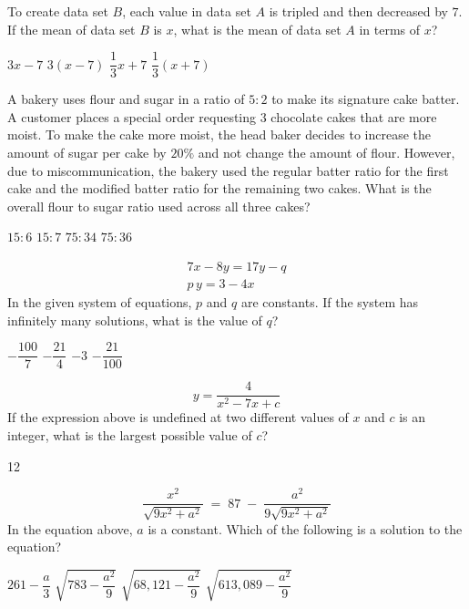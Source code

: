 \question[1]
To create data set $B$, each value in data set $A$ is tripled and then decreased by $7$. If the mean of data set $B$ is $x$, what is the mean of data set $A$ in terms of $x$?
\begin{choices}
  \choice $3x-7$
  \choice $3(x-7)$
  \choice $\dfrac{1}{3}x+7$
  \CorrectChoice $\dfrac{1}{3}(x+7)$
\end{choices}






\newpage




\question[1]
A bakery uses flour and sugar in a ratio of $5:2$ to make its signature cake batter. A customer places a special order requesting 3 chocolate cakes that are more moist. To make the cake more moist, the head baker decides to increase the amount of sugar per cake by $20\%$ and not change the amount of flour. However, due to miscommunication, the bakery used the regular batter ratio for the first cake and the modified batter ratio for the remaining two cakes. What is the overall flour to sugar ratio used across all three cakes?
\begin{choices}
  \choice $15:6$
  \choice $15:7$
  \CorrectChoice $75:34$
  \choice $75:36$
\end{choices}

\question[1]
\[
\begin{gathered}
7x-8y = 17y - q \\
p\,y = 3 - 4x
\end{gathered}
\]
In the given system of equations, $p$ and $q$ are constants. If the system has infinitely many solutions, what is the value of $q$?
\begin{choices}
  \choice $-\dfrac{100}{7}$
  \CorrectChoice $-\dfrac{21}{4}$
  \choice $-3$
  \choice $-\dfrac{21}{100}$
\end{choices}






\newpage




\question[1]
\[
y=\frac{4}{x^2-7x+c}
\]
If the expression above is undefined at two different values of $x$ and $c$ is an integer, what is the largest possible value of $c$?
\begin{solution}
12
\end{solution}


\question[1]
\[
\frac{x^2}{\sqrt{9x^2+a^2}} \;=\; 87 \;-\; \frac{a^2}{9\sqrt{9x^2+a^2}}
\]
In the equation above, $a$ is a constant. Which of the following is a solution to the equation?
\begin{choices}
  \choice $261-\dfrac{a}{3}$
  \choice $\sqrt{783-\dfrac{a^2}{9}}$
  \CorrectChoice $\sqrt{68{,}121-\dfrac{a^2}{9}}$
  \choice $\sqrt{613{,}089-\dfrac{a^2}{9}}$
\end{choices}


